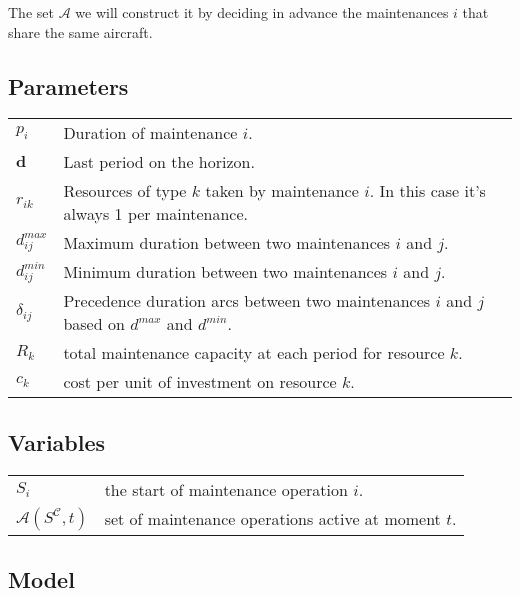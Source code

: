 \documentclass[a4paper,11pt]{article}
\begin{document}
    \vskip 0.3cm

    The set $\mathcal{A}$ we will construct it by deciding in advance the maintenances $i$ that share the same aircraft.

    \subsection{Parameters}

    \begin{tabular}{ll}
        $p_i$ & Duration of maintenance $i$.\\
        $\mathbf{d}$ & Last period on the horizon.\\
        $r_{ik}$ & Resources of type $k$ taken by maintenance $i$. In this case it's always 1 per maintenance.\\
        $d^{max}_{ij}$ & Maximum duration between two maintenances $i$ and $j$.\\
        $d^{min}_{ij}$ & Minimum duration between two maintenances $i$ and $j$.\\
        ${\delta}_{ij}$ & Precedence duration arcs between two maintenances $i$ and $j$ based on $d^{max}$ and $d^{min}$.\\
        $R_k$ & total maintenance capacity at each period for resource $k$.\\
        $c_k$ & cost per unit of investment on resource $k$.
    \end{tabular}

    \subsection{Variables}

    \begin{tabular}{ll}
        $S_i$ & the start of maintenance operation $i$.\\
        $\mathcal{A}(S^{\mathcal{C}}, t)$ & set of maintenance operations active at moment $t$.\\
    \end{tabular}

    \subsection{Model}
\end{document}

